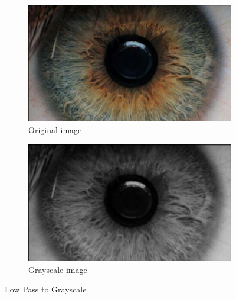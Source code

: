 \documentclass{article}
\begin{document}
%
%
\begin{figure}[H]
\centering

\begin{subfigure}{.5\textwidth}
  \centering
  \includegraphics[width=0.9\linewidth]{res/pupil/low_pass_n.jpg}
  \caption{Original image}
  \label{fig:original_img}
\end{subfigure}%
\begin{subfigure}{.5\textwidth}
  \centering
  \includegraphics[width=0.9\linewidth]{res/pupil/gray_n.jpg}
  \caption{Grayscale image}
  \label{fig:gray_img}
\end{subfigure}


\caption{Low Pass to Grayscale}
\label{fig:result_pup_low_gray}
\end{figure}
\end{document}
